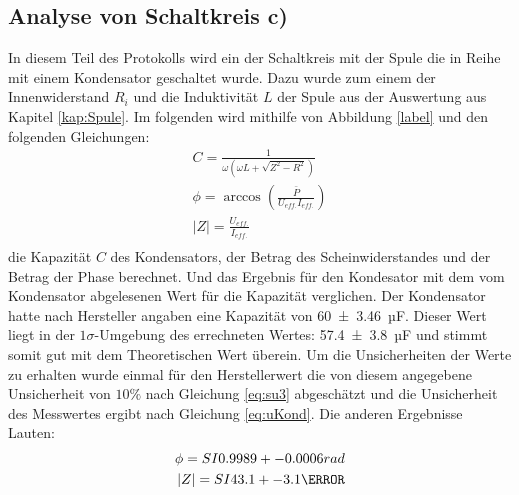 \subsection{Analyse von Schaltkreis c)}
In diesem Teil des Protokolls wird ein der Schaltkreis mit der Spule die in Reihe mit einem Kondensator geschaltet wurde.
Dazu wurde zum einem der Innenwiderstand $R_i$ und die Induktivität $L$ der Spule aus der Auswertung aus Kapitel \ref{kap:Spule}.
Im folgenden wird mithilfe von Abbildung \ref{label}
und den folgenden Gleichungen:
\begin{align}
C=\frac{1}{\omega (\omega L+\sqrt{Z^2-R^2})}\\	
\phi = \arccos\left(\frac{\bar{P}}{U_{eff.}I_{eff.}}\right)\\
	|Z|=\frac{U_{eff.}}{I_{eff.}}\\	
\end{align}
die Kapazität $C$ des Kondensators, der Betrag des Scheinwiderstandes und der Betrag der Phase berechnet. Und das Ergebnis für den Kondesator mit dem vom Kondensator abgelesenen Wert für die Kapazität verglichen.
Der Kondensator hatte nach Hersteller angaben eine Kapazität von \SI{60+-3.46}{µF}.
Dieser Wert liegt in der $1\sigma$-Umgebung des errechneten Wertes: \SI{57.4+-3.8}{µF} und stimmt somit gut mit dem Theoretischen Wert überein.
Um die Unsicherheiten der Werte zu erhalten wurde einmal für den Herstellerwert die von diesem angegebene Unsicherheit von $10\%$ nach Gleichung
\ref{eq:su3} abgeschätzt und die Unsicherheit des Messwertes ergibt nach Gleichung \ref{eq:uKond}.
Die anderen Ergebnisse Lauten:
\begin{align}
	\phi=SI{0.9989+-0.0006}{rad}\\
	|Z|=SI{43.1+-3.1}{\ohm}
\end{align}
